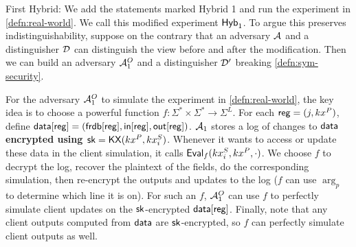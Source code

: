 

First Hybrid: We add the statements marked Hybrid 1 and run the experiment in \cref{defn:real-world}. We call this modified experiment $\mathsf{Hyb}_1$. To argue this preserves indistinguishability, suppose on the contrary that an adversary $\mathcal{A}$ and a distinguisher $\mathcal{D}$ can distinguish the view before and after the modification. Then we can build an adversary $\mathcal{A}_1^O$ and a distinguisher $\mathcal{D}'$ breaking \cref{defn:sym-security}. 

For the adversary $\mathcal{A}_1^O$ to simulate the experiment in \cref{defn:real-world}, the key idea is to choose a powerful function $f: \Sigma^* \times \Sigma^* \to \Sigma^L$. For each $\mathsf{reg} = (j, kx^P)$, define $\mathsf{data}[\mathsf{reg}] = (\mathsf{frdb}[\mathsf{reg}], \mathsf{in}[\mathsf{reg}], \mathsf{out}[\mathsf{reg}])$. $\mathcal{A}_1$ stores a log of changes to $\mathsf{data}$ \textbf{encrypted using ${\mathsf{sk}} = \mathsf{KX}(kx^P, kx_i^S)$}. Whenever it wants to access or update these data in the client simulation, it calls $\mathsf{Eval}_f(kx_i^S, kx^P, \cdot)$. We choose $f$ to decrypt the log, recover the plaintext of the fields, do the corresponding simulation, then re-encrypt the outputs and updates to the log ($f$ can use $\arg_p$ to determine which line it is on). For such an $f$, $\mathcal{A}_1^O$ can use $f$ to perfectly simulate client updates on the ${\mathsf{sk}}$-encrypted $\mathsf{data}[\mathsf{reg}]$. Finally, note that any client outputs computed from $\mathsf{data}$ are ${\mathsf{sk}}$-encrypted, so $f$ can perfectly simulate client outputs as well. 

